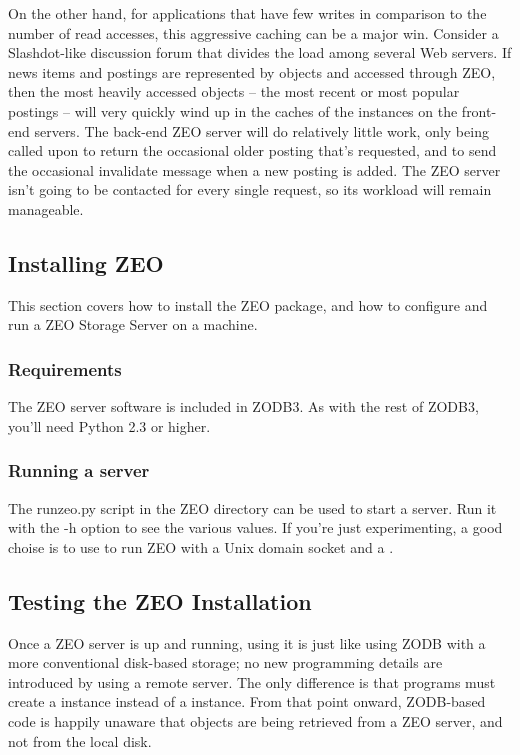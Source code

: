 On the other hand, for applications that have few writes in comparison
to the number of read accesses, this aggressive caching can be a major
win.  Consider a Slashdot-like discussion forum that divides the load
among several Web servers.  If news items and postings are represented
by objects and accessed through ZEO, then the most heavily accessed
objects -- the most recent or most popular postings -- will very
quickly wind up in the caches of the
 instances on the front-end servers.  The
back-end ZEO server will do relatively little work, only being called
upon to return the occasional older posting that's requested, and to
send the occasional invalidate message when a new posting is added.
The ZEO server isn't going to be contacted for every single request,
so its workload will remain manageable.

\subsection{Installing ZEO}

This section covers how to install the ZEO package, and how to 
configure and run a ZEO Storage Server on a machine. 

\subsubsection{Requirements}

The ZEO server software is included in ZODB3.  As with the rest of
ZODB3, you'll need Python 2.3 or higher.

\subsubsection{Running a server}

The runzeo.py script in the ZEO directory can be used to start a
server.  Run it with the -h option to see the various values.  If
you're just experimenting, a good choise is to use 
 to run
ZEO with a Unix domain socket and a .

\subsection{Testing the ZEO Installation}

Once a ZEO server is up and running, using it is just like using ZODB
with a more conventional disk-based storage; no new programming
details are introduced by using a remote server.  The only difference
is that programs must create a  instance instead
of a  instance.  From that point onward, ZODB-based
code is happily unaware that objects are being retrieved from a ZEO
server, and not from the local disk.

